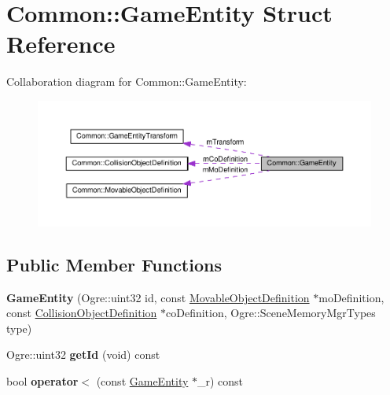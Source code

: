 \hypertarget{struct_common_1_1_game_entity}{}\section{Common\+:\+:Game\+Entity Struct Reference}
\label{struct_common_1_1_game_entity}


Collaboration diagram for Common\+:\+:Game\+Entity\+:\nopagebreak
\begin{figure}[H]
\begin{center}
\leavevmode
\includegraphics[width=350pt]{struct_common_1_1_game_entity__coll__graph}
\end{center}
\end{figure}
\subsection*{Public Member Functions}
\begin{DoxyCompactItemize}
\item 
\mbox{\label{struct_common_1_1_game_entity_a1478181c16b5132fce75352afa88a3a8}} 
{\bfseries Game\+Entity} (Ogre\+::uint32 id, const \hyperlink{struct_common_1_1_movable_object_definition}{Movable\+Object\+Definition} $\ast$mo\+Definition, const \hyperlink{struct_common_1_1_collision_object_definition}{Collision\+Object\+Definition} $\ast$co\+Definition, Ogre\+::\+Scene\+Memory\+Mgr\+Types type)
\item 
\mbox{\label{struct_common_1_1_game_entity_ada4fa423b9c2efaa5ac97f8a081c7d7b}} 
Ogre\+::uint32 {\bfseries get\+Id} (void) const
\item 
\mbox{\label{struct_common_1_1_game_entity_a9d46d0e1dfa65029ee7acda84b5d648f}} 
bool {\bfseries operator$<$} (const \hyperlink{struct_common_1_1_game_entity}{Game\+Entity} $\ast$\+\_\+r) const
\end{DoxyCompactItemize}
